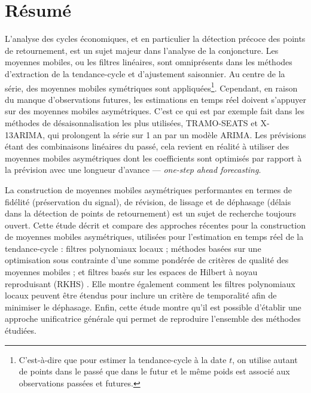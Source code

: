 \thispagestyle{fancy}

\hypertarget{ruxe9sumuxe9}{%
\section*{Résumé}\label{ruxe9sumuxe9}}

L'analyse des cycles économiques, et en particulier la détection précoce
des points de retournement, est un sujet majeur dans l'analyse de la
conjoncture. Les moyennes mobiles, ou les filtres linéaires, sont
omniprésents dans les méthodes d'extraction de la tendance-cycle et
d'ajustement saisonnier. Au centre de la série, des moyennes mobiles
symétriques sont appliquées\footnote{ C'est-à-dire que pour estimer la
  tendance-cycle à la date \(t\), on utilise autant de points dans le
  passé que dans le futur et le même poids est associé aux observations
  passées et futures.}. Cependant, en raison du manque d'observations
futures, les estimations en temps réel doivent s'appuyer sur des
moyennes mobiles asymétriques. C'est ce qui est par exemple fait dans
les méthodes de désaisonnalisation les plus utilisées, TRAMO-SEATS et
X-13ARIMA, qui prolongent la série sur 1 an par un modèle ARIMA. Les
prévisions étant des combinaisons linéaires du passé, cela revient en
réalité à utiliser des moyennes mobiles asymétriques dont les
coefficients sont optimisés par rapport à la prévision avec une longueur
d'avance --- \emph{one-step ahead forecasting}.

La construction de moyennes mobiles asymétriques performantes en termes
de fidélité (préservation du signal), de révision, de lissage et de
déphasage (délais dans la détection de points de retournement) est un
sujet de recherche toujours ouvert. Cette étude décrit et compare des
approches récentes pour la construction de moyennes mobiles
asymétriques, utilisées pour l'estimation en temps réel de la
tendance-cycle : filtres polynomiaux locaux
\autocite{proietti2008,GrayThomson1996} ; méthodes basées sur une
optimisation sous contrainte d'une somme pondérée de critères de qualité
des moyennes mobiles \autocite{ch15HBSA,trilemmaWMR2019} ; et filtres
basés sur les espaces de Hilbert à noyau reproduisant (RKHS)
\textcite{dagumbianconcini2008}. Elle montre également comment les
filtres polynomiaux locaux peuvent être étendus pour inclure un critère
de temporalité afin de minimiser le déphasage. Enfin, cette étude montre
qu'il est possible d'établir une approche unificatrice générale qui
permet de reproduire l'ensemble des méthodes étudiées.

